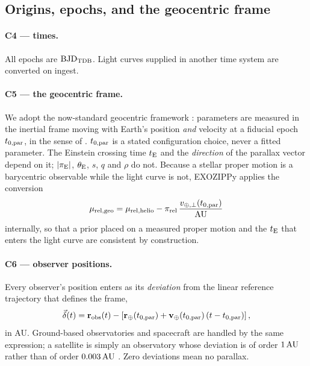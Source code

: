 \subsection{Origins, epochs, and the geocentric frame}
\label{sec:conv:origins}

\paragraph{C4 --- times.}  All epochs are ${\rm BJD}_{\rm TDB}$.  Light
curves supplied in another time system are converted on ingest.

\paragraph{C5 --- the geocentric frame.}  We adopt the now-standard
geocentric framework \citep{An:2002, Gould:2004}: parameters are measured in
the inertial frame moving with Earth's position \emph{and} velocity at a
fiducial epoch $t_{0,\rm par}$, in the sense of \citet{Skowron:2011}.
$t_{0,\rm par}$ is a stated configuration choice, never a fitted parameter.
The Einstein crossing time $t_{\rm E}$ and the \emph{direction} of the
parallax vector depend on it; $|\pi_{\rm E}|$, $\theta_{\rm E}$, $s$, $q$
and $\rho$ do not.  Because a stellar proper motion is a barycentric
observable while the light curve is not, EXOZIPPy applies the
\citet{Gould:2004} conversion
\begin{equation}
  \mu_{\rm rel,geo} = \mu_{\rm rel,helio}
    - \pi_{\rm rel}\, \frac{v_{\oplus,\perp}(t_{0,\rm par})}{{\rm AU}}
  \label{eq:mugeo}
\end{equation}
internally, so that a prior placed on a measured proper motion and the
$t_{\rm E}$ that enters the light curve are consistent by construction.

\paragraph{C6 --- observer positions.}  Every observer's position enters as
its \emph{deviation} from the linear reference trajectory that defines the
frame,
\begin{equation}
  \vec{\delta}(t) = \mathbf{r}_{\rm obs}(t)
    - \left[\mathbf{r}_\oplus(t_{0,\rm par})
      + \mathbf{v}_\oplus(t_{0,\rm par})\,(t - t_{0,\rm par})\right],
  \label{eq:deviation}
\end{equation}
in AU.  Ground-based observatories and spacecraft are handled by the same
expression; a satellite is simply an observatory whose deviation is of order
$1\,{\rm AU}$ rather than of order $0.003\,{\rm AU}$
\citep[cf.][Section~3]{Yee:2015}.  Zero deviations mean no parallax.

